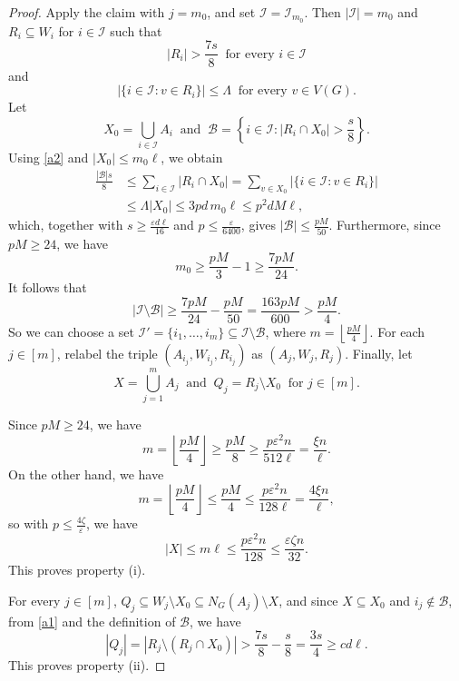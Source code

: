\documentclass[11pt,a4paper]{article}
\theoremstyle{definition}
\theoremstyle{remark}
\newcommand{\eps}{\varepsilon}
\begin{document}
\begin{proof}
Apply the claim with $j=m_0$, and set
$\mathcal I=\mathcal I_{m_0}$.
Then $|\mathcal I|=m_0$ and $R_i\subseteq W_i$ for 
$i\in\mathcal I$ such that 
\begin{equation}\label{a1}
 |R_i|>\frac{7s}{8}
 \ \text{ for every }i\in\mathcal I
\end{equation}
and
\begin{equation}\label{a2}
 \bigl|\{i\in\mathcal I:v\in R_i\}\bigr|\le\Lambda
\ \text{ for every }v\in V(G).
\end{equation}
Let 
\[
 X_0=\bigcup_{i\in\mathcal I}A_i \
  \text{ and } \
 \mathcal B=\left\{i\in\mathcal I:
             |R_i\cap X_0|>\frac{s}{8}\right\}.
\]
Using \eqref{a2} and
$|X_0|\le m_0\ell$, we obtain
\[
 \begin{aligned}
 \frac{|\mathcal B|s}{8}
 &\le\sum_{i\in\mathcal I}|R_i\cap X_0|
   =\sum_{v\in X_0}\bigl|\{i\in\mathcal I:v\in R_i\}\bigr|\\
 &\le\Lambda|X_0|
 \le3pd\,m_0\ell
 \le p^2dM\ell,
 \end{aligned}
\]
which, together with $s\ge\frac{\eps d\ell}{16}$ and
$p\le\frac{\eps}{6400}$,  gives
$|\mathcal B|\le\frac{pM}{50}$. 
Furthermore, since $pM\ge24$, we have
\[
 m_0\ge\frac{pM}{3}-1\ge\frac{7pM}{24}.
\]
It follows that
\[
 |\mathcal I\setminus\mathcal B|
 \ge\frac{7pM}{24}-\frac{pM}{50}
 =\frac{163pM}{600}>\frac{pM}{4}.
\]
So we can 
choose  a set
$\mathcal I'=\{i_1,\ldots,i_m\}\subseteq
\mathcal I\setminus\mathcal B$, where
$m=\left\lfloor\frac{pM}{4}\right\rfloor$. For each
$j\in[m]$, relabel the triple
$(A_{i_j},W_{i_j},R_{i_j})$ as $(A_j,W_j,R_j)$. Finally, let
\[
 X=\bigcup_{j=1}^mA_j 
\  \text{ and } \  
 Q_j=R_j\setminus X_0 \ \text{ for } j\in[m].
\]



Since $pM\ge24$, we have
\[
 m=\left\lfloor\frac{pM}{4}\right\rfloor \ge\frac{pM}{8}
 \ge\frac{p\eps^2n}{512\ell}
 =\frac{\xi n}{\ell}.
\]
On the other hand, we have
\[
 m=\left\lfloor\frac{pM}{4}\right\rfloor \le\frac{pM}{4}
 \le\frac{p\eps^2n}{128\ell}
 =\frac{4\xi n}{\ell},
\]
so with $p\le\frac{4\zeta}{\eps}$, we have
\[
 |X|\le m\ell\le\frac{p\eps^2n}{128}
 \le\frac{\eps\zeta n}{32}.
\]
This proves property (i).

For every
$j\in[m]$, $Q_j\subseteq W_j\setminus X_0
       \subseteq N_G(A_j)\setminus X$, and 
since $X\subseteq X_0$ and $i_j\notin\mathcal B$,  from \eqref{a1} and the definition of $\mathcal B$, we have
\[ 
 |Q_j|=|R_j\setminus (R_j\cap X_0)|>\frac{7s}{8}-\frac{s}{8}
       =\frac{3s}{4}\ge cd\ell.
\]
This proves property (ii).



\end{proof}
\end{document}
